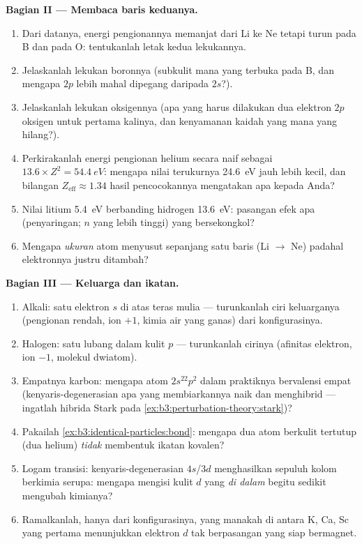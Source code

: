 \begin{problem}
\medskip\noindent\textbf{Bagian II --- Membaca baris keduanya.}
\begin{enumerate}[resume]
  \item Dari datanya, energi pengionannya memanjat dari Li ke Ne tetapi
        turun pada B dan pada O: tentukanlah letak kedua lekukannya.
  \item Jelaskanlah lekukan boronnya (subkulit mana yang terbuka pada B,
        dan mengapa $2p$ lebih mahal dipegang daripada $2s$?).
  \item Jelaskanlah lekukan oksigennya (apa yang harus dilakukan dua
        elektron $2p$ oksigen untuk pertama kalinya, dan kenyamanan
        kaidah yang mana yang hilang?).
  \item Perkirakanlah energi pengionan helium secara naif sebagai
        $13.6 \times Z^2 = \qty{54.4}{eV}$: mengapa nilai terukurnya
        \qty{24.6}{eV} jauh lebih kecil, dan bilangan
        $Z_{\text{eff}} \approx 1.34$ hasil pencocokannya mengatakan apa
        kepada Anda?
  \item Nilai litium \qty{5.4}{eV} berbanding hidrogen \qty{13.6}{eV}:
        pasangan efek apa (penyaringan; $n$ yang lebih tinggi) yang
        bersekongkol?
  \item Mengapa \emph{ukuran} atom menyusut sepanjang satu baris
        (Li $\to$ Ne) padahal elektronnya justru ditambah?
\end{enumerate}

\medskip\noindent\textbf{Bagian III --- Keluarga dan ikatan.}
\begin{enumerate}[resume]
  \item Alkali: satu elektron $s$ di atas teras mulia --- turunkanlah
        ciri keluarganya (pengionan rendah, ion $+1$, kimia air yang
        ganas) dari konfigurasinya.
  \item Halogen: satu lubang dalam kulit $p$ --- turunkanlah cirinya
        (afinitas elektron, ion $-1$, molekul dwiatom).
  \item Empatnya karbon: mengapa atom $2s^22p^2$ dalam praktiknya
        bervalensi empat (kenyaris-degenerasian apa yang membiarkannya
        naik dan menghibrid --- ingatlah hibrida Stark pada
        \cref{ex:b3:perturbation-theory:stark})?
  \item Pakailah \cref{ex:b3:identical-particles:bond}: mengapa dua atom
        berkulit tertutup (dua helium) \emph{tidak} membentuk ikatan
        kovalen?
  \item Logam transisi: kenyaris-degenerasian $4s$/$3d$ menghasilkan
        sepuluh kolom berkimia serupa: mengapa mengisi kulit $d$ yang
        \emph{di dalam} begitu sedikit mengubah kimianya?
  \item Ramalkanlah, hanya dari konfigurasinya, yang manakah di antara
        K, Ca, Sc yang pertama menunjukkan elektron $d$ tak berpasangan
        yang siap bermagnet.
\end{enumerate}


\end{problem}
